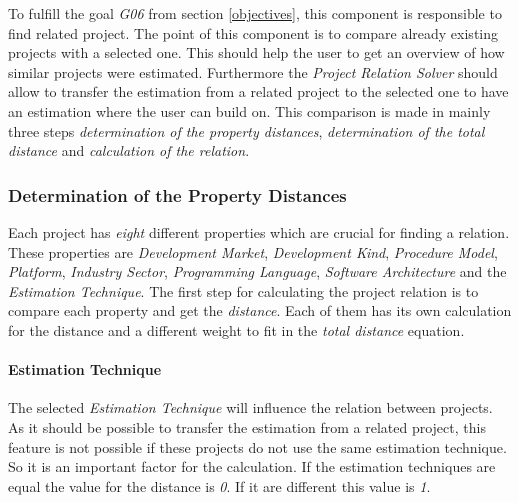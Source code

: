 To fulfill the goal \textit{G06} from section \ref{objectives}, this component is responsible to find related project. The point of this component is to compare already existing projects with a selected one. This should help the user to get an overview of how similar projects were estimated. Furthermore the \textit{Project Relation Solver} should allow to transfer the estimation from a related project to the selected one to have an estimation where the user can build on. This comparison is made in mainly three steps \textit{determination of the property distances}, \textit{determination of the total distance} and \textit{calculation of the relation}.

\subsubsection{\textbf{Determination of the Property Distances}}
Each project has \textit{eight} different properties which are crucial for finding a relation. These properties are \textit{Development Market}, \textit{Development Kind}, \textit{Procedure Model}, \textit{Platform}, \textit{Industry Sector}, \textit{Programming Language}, \textit{Software Architecture} and the \textit{Estimation Technique}. The first step for calculating the project relation is to compare each property and get the \textit{distance}. Each of them has its own calculation for the distance and a different weight to fit in the \textit{total distance} equation. 

\paragraph*{\textbf{Estimation Technique}}

The selected \textit{Estimation Technique} will influence the relation between projects. As it should be possible to transfer the estimation from a related project, this feature is not possible if these projects do not use the same estimation technique. So it is an important factor for the calculation. If the estimation techniques are equal the value for the distance is \textit{0}. If it are different this value is \textit{1}.

